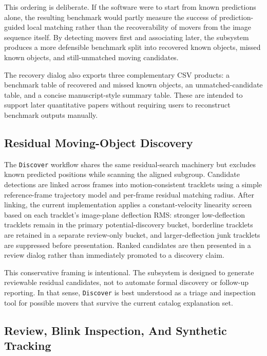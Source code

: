 \documentclass[modern]{aastex701}
\begin{document}
This ordering is deliberate. If the software were to start from known predictions alone, the resulting benchmark would partly measure the success of prediction-guided local matching rather than the recoverability of movers from the image sequence itself. By detecting movers first and associating later, the subsystem produces a more defensible benchmark split into recovered known objects, missed known objects, and still-unmatched moving candidates.

The recovery dialog also exports three complementary CSV products: a benchmark table of recovered and missed known objects, an unmatched-candidate table, and a concise manuscript-style summary table. These are intended to support later quantitative papers without requiring users to reconstruct benchmark outputs manually.

\subsection{Residual Moving-Object Discovery}\label{subsec:discover}

The \texttt{Discover} workflow shares the same residual-search machinery but excludes known predicted positions while scanning the aligned subgroup. Candidate detections are linked across frames into motion-consistent tracklets using a simple reference-frame trajectory model and per-frame residual matching radius. After linking, the current implementation applies a constant-velocity linearity screen based on each tracklet's image-plane deflection RMS: stronger low-deflection tracklets remain in the primary potential-discovery bucket, borderline tracklets are retained in a separate review-only bucket, and larger-deflection junk tracklets are suppressed before presentation. Ranked candidates are then presented in a review dialog rather than immediately promoted to a discovery claim.

This conservative framing is intentional. The subsystem is designed to generate reviewable residual candidates, not to automate formal discovery or follow-up reporting. In that sense, \texttt{Discover} is best understood as a triage and inspection tool for possible movers that survive the current catalog explanation set.

\subsection{Review, Blink Inspection, And Synthetic Tracking}\label{subsec:review}
\end{document}
